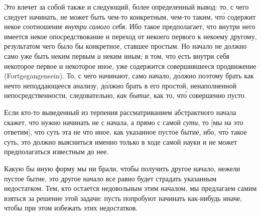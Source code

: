 Это влечет за собой также и следующий, более определенный
вывод: то, с чего следует начинать, не может
быть чем-то конкретным, чем-то таким, чт\'о содержит некое
соотношение \emph{внутри самого себя}. Ибо такое предполагает,
что внутри него имеется некое опосредствование
и переход от некоего первого к некоему другому,
результатом чего было бы конкретное, ставшее простым.
Но начало не должно само уже быть неким первым \emph{и}
неким иным; в том, что есть внутри себя некоторое первое
и некоторое иное, уже содержится совершившееся
продвижение (Fortgegangensein). То, с чего начинают,
само начало, д\'олжно поэтому брать как нечто неподдающееся
анализу, д\'олжно брать в его простой, ненаполненной
непосредственности, следовательно, \emph{как бытие}, как
то, чт\'о совершенно пусто.

Если кто-то выведенный из терпения рассматриванием
абстрактного начала скажет, что нужно начинать не
с начала, а прямо с самой \emph{сути}, то [мы на это ответим],
что суть эта не что иное, как указанное пустое бытие,
ибо, чт\'о такое суть, это должно выясниться именно только
в ходе самой науки и не может предполагаться известным
до нее.

Какую бы иную форму мы ни брали, чтобы получить
другое начало, нежели пустое бытие, это другое начало
все равно будет страдать указанным недостатком. Тем,
кто остается недовольным этим началом, мы предлагаем
самим взяться за решение этой задачи: пусть попробуют
начинать как-нибудь иначе, чтобы при этом избежать
этих недостатков.

